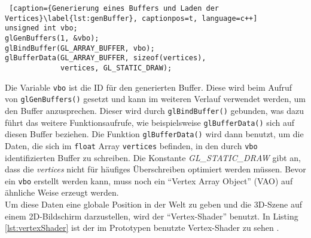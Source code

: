 \documentclass[11pt,a4paper]{article}
\begin{document}
\begin{lstlisting} [caption={Generierung eines Buffers und Laden der Vertices}\label{lst:genBuffer}, captionpos=t, language=c++]
unsigned int vbo;
glGenBuffers(1, &vbo);
glBindBuffer(GL_ARRAY_BUFFER, vbo);
glBufferData(GL_ARRAY_BUFFER, sizeof(vertices),
             vertices, GL_STATIC_DRAW);
\end{lstlisting}
\noindent
Die Variable \lstinline!vbo! ist die ID für den generierten Buffer. Diese wird beim Aufruf von \lstinline!glGenBuffers()! gesetzt und kann im weiteren Verlauf verwendet werden, um den Buffer anzusprechen. Dieser wird durch \lstinline!glBindBuffer()! gebunden, was dazu führt das weitere Funktionsaufrufe, wie beispielsweise \lstinline!glBufferData()! sich auf diesen Buffer beziehen. Die Funktion \lstinline!glBufferData()! wird dann benutzt, um die Daten, die sich im \lstinline!float! Array \lstinline!vertices! befinden, in den durch \lstinline!vbo! identifizierten Buffer zu schreiben. Die Konstante \mbox{\textit{GL\_STATIC\_DRAW}} gibt an, dass die \mbox{\textit{vertices}} nicht für häufiges Überschreiben optimiert werden müssen. Bevor ein \lstinline!vbo! erstellt werden kann, muss noch ein ``Vertex Array Object'' (VAO) auf ähnliche Weise erzeugt werden.\\
Um diese Daten eine globale Position in der Welt zu geben und die 3D-Szene auf einem 2D-Bildschirm darzustellen, wird der ``Vertex-Shader'' benutzt. In Listing \ref{lst:vertexShader} ist der im Prototypen benutzte Vertex-Shader zu sehen \cite[Coordinate Systems]{LearnOpenGL}.
\end{document}
